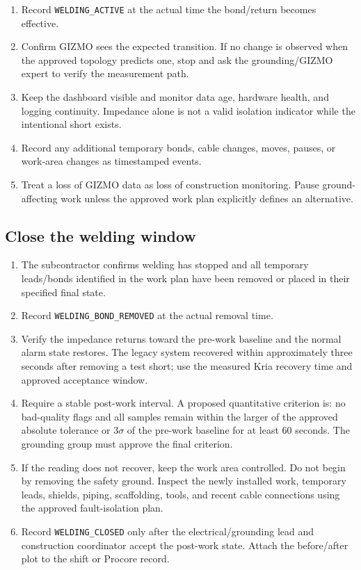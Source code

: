 \documentclass[11pt]{article}
\newcommand{\GIZMO}{\textsc{GIZMO}}
\begin{document}
\begin{enumerate}
  \item Record \texttt{WELDING\_ACTIVE} at the actual time the bond/return becomes effective.
  \item Confirm \GIZMO{} sees the expected transition. If no change is observed when the approved topology predicts one, stop and ask the grounding/\GIZMO{} expert to verify the measurement path.
  \item Keep the dashboard visible and monitor data age, hardware health, and logging continuity. Impedance alone is not a valid isolation indicator while the intentional short exists.
  \item Record any additional temporary bonds, cable changes, moves, pauses, or work-area changes as timestamped events.
  \item Treat a loss of \GIZMO{} data as loss of construction monitoring. Pause ground-affecting work unless the approved work plan explicitly defines an alternative.
\end{enumerate}

\subsection{Close the welding window}

\begin{enumerate}
  \item The subcontractor confirms welding has stopped and all temporary leads/bonds identified in the work plan have been removed or placed in their specified final state.
  \item Record \texttt{WELDING\_BOND\_REMOVED} at the actual removal time.
  \item Verify the impedance returns toward the pre-work baseline and the normal alarm state restores. The legacy system recovered within approximately three seconds after removing a test short; use the measured Kria recovery time and approved acceptance window.
  \item Require a stable post-work interval. A proposed quantitative criterion is: no bad-quality flags and all samples remain within the larger of the approved absolute tolerance or $3\sigma$ of the pre-work baseline for at least 60 seconds. The grounding group must approve the final criterion.
  \item If the reading does not recover, keep the work area controlled. Do not begin by removing the safety ground. Inspect the newly installed work, temporary leads, shields, piping, scaffolding, tools, and recent cable connections using the approved fault-isolation plan.
  \item Record \texttt{WELDING\_CLOSED} only after the electrical/grounding lead and construction coordinator accept the post-work state. Attach the before/after plot to the shift or Procore record.
\end{enumerate}
\end{document}
